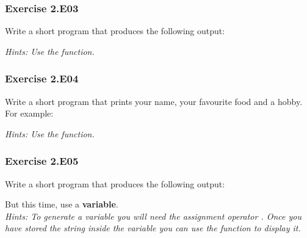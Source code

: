 

\subsubsection*{Exercise 2.E03}
Write a short program that produces the following output:
\begin{center}
	{}
\end{center}


\textit{Hints:
Use the {} function.
}\\[1cm]



\subsubsection*{Exercise 2.E04}

Write a short program that prints your name, your favourite food and a hobby. For example:
\begin{center}
	{}
\end{center}


\textit{Hints:
Use the {} function.}\\[1cm]




\subsubsection*{Exercise 2.E05}
Write a short program that produces the following output:
\begin{center}
	{}
\end{center}
But this time, use a \textbf{variable}.\\


\textit{Hints:
To generate a variable you will need the assignment operator {\code{=}}. Once you have stored the string inside the variable you can use the {} function to display it.}\\[1cm]




